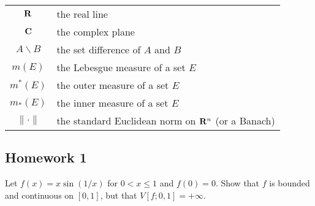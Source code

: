 \begin{tabular}{c|l}
$\mathbf{R}$&the real line\\
$\mathbf{C}$&the complex plane\\
$A\smallsetminus B$&the set difference of $A$ and $B$\\
$m(E)$&the Lebesgue measure of a set $E$\\
$m^*(E)$&the outer measure of a set $E$\\
$m_*(E)$&the inner measure of a set $E$\\
$\|\cdot\|$&the standard Euclidean norm on $\mathbf{R}^n$ (or a Banach)\\
\end{tabular}

\subsection{Homework 1}
\begin{problem}
Let $f(x)=x\sin(1/x)$ for $0<x\leq 1$ and $f(0)=0$. Show that $f$ is
bounded and continuous on $[0,1]$, but that $V[f;0,1]=+\infty$.
\end{problem}
